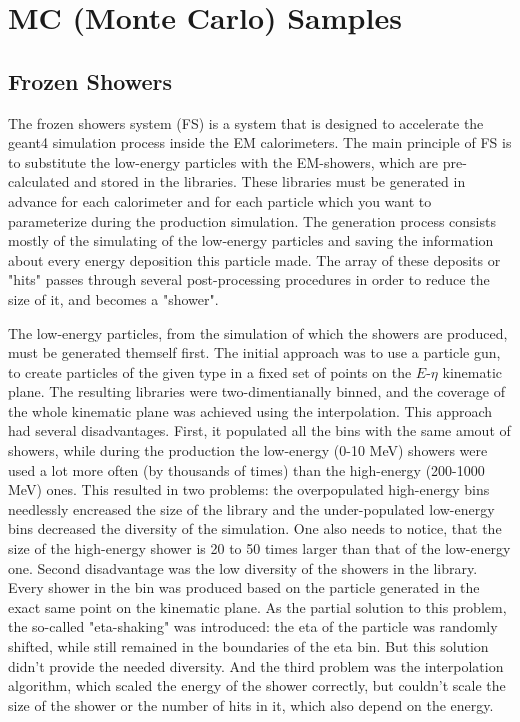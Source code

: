 \chapter{MC (Monte Carlo) Samples}
\label{sec:MCSamples}

\section{Frozen Showers}
\label{MC_FS}
The frozen showers system (FS) is a system that is designed to accelerate the geant4 simulation process inside the EM calorimeters. The main principle of FS is to substitute the low-energy particles with the EM-showers, which are pre-calculated and stored in the libraries. These libraries must be generated in advance for each calorimeter and for each particle which you want to parameterize during the production simulation. The generation process consists mostly of the simulating of the low-energy particles and saving the information about every energy deposition this particle made. The array of these deposits or "hits" passes through several post-processing procedures in order to reduce the size of it, and becomes a "shower".

The low-energy particles, from the simulation of which the showers are produced, must be generated themself first. The initial approach was to use a particle gun, to create particles of the given type in a fixed set of points on the $E$-$\eta$ kinematic plane. The resulting libraries were two-dimentianally binned, and the coverage of the whole kinematic plane was achieved using the interpolation. This approach had several disadvantages. First, it populated all the bins with the same amout of showers, while during the production the low-energy (0-10 MeV) showers were used a lot more often (by thousands of times) than the high-energy (200-1000 MeV) ones. This resulted in two problems: the overpopulated high-energy bins needlessly encreased the size of the library and the under-populated low-energy bins decreased the diversity of the simulation. One also needs to notice, that the size of the high-energy shower is 20 to 50 times larger than that of the low-energy one. Second disadvantage was the low diversity of the showers in the library. Every shower in the bin was produced based on the particle generated in the exact same point on the kinematic plane. As the partial solution to this problem, the so-called "eta-shaking" was introduced: the eta of the particle was randomly shifted, while still remained in the boundaries of the eta bin. But this solution didn't provide the needed diversity. And the third problem was the interpolation algorithm, which scaled the energy of the shower correctly, but couldn't scale the size of the shower or the number of hits in it, which also depend on the energy.

